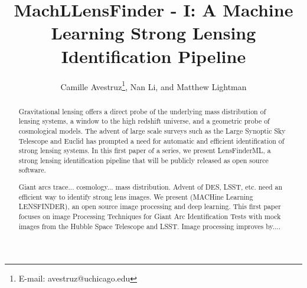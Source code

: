 \documentclass{emulateapj}
\begin{document}
 

\title{MachLLensFinder - I: A Machine Learning Strong Lensing
  Identification Pipeline}

\author{Camille Avestruz\thanks{E-mail:
    avestruz@uchicago.edu}, Nan Li, and Matthew Lightman }


  
\begin{abstract} 
  Gravitational lensing offers a direct probe of the underlying mass
  distribution of lensing systems, a window to the high redshift
  universe, and a geometric probe of cosmological models.  The advent
  of large scale surveys such as the Large Synoptic Sky Telescope and
  Euclid has prompted a need for automatic and efficient
  identification of strong lensing systems.  In this first paper of a
  series, we present LensFinderML, a strong lensing identification
  pipeline that will be publicly released as open source software.

Giant arcs trace... cosmology... mass distribution.  Advent of DES,
LSST, etc. need an efficient way to identify strong lens images.  We
present {} (MACHine Learning LENSFINDER), an open
source image processing and deep learning.  This first paper focuses
on image Processing Techniques for Giant Arc Identification Tests with
mock images from the Hubble Space Telescope and LSST.  Image
processing improves by....
\end{abstract}
\end{document}
